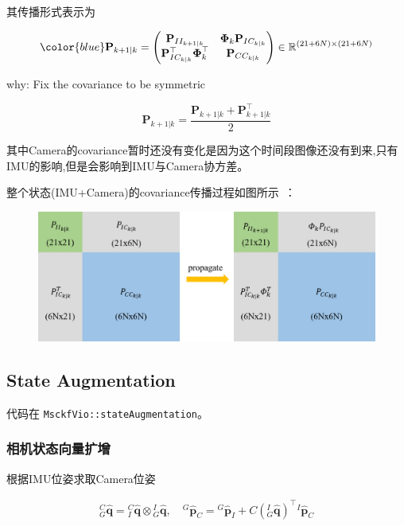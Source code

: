 \documentclass[12pt,a4paper]{article}
\begin{document}
其传播形式表示为

\begin{equation}
{\color{blue}
\mathbf{P}_{k+1|k} = 
\begin{pmatrix}
\mathbf{P}_{II_{k+1|k}} & \boldsymbol{\Phi}_k \mathbf{P}_{IC_{k|k}} \\
\mathbf{P}_{IC_{k|k}}^\top \boldsymbol{\Phi}_k^\top & \mathbf{P}_{CC_{k|k}}
\end{pmatrix}
\in \mathbb{R}^{(21+6N) \times (21+6N)}
}
\end{equation}

{\color{red}why: Fix the covariance to be symmetric}

\begin{equation}
\mathbf{P}_{k+1|k} = \frac{\mathbf{P}_{k+1|k} + \mathbf{P}_{k+1|k}^{\top}}{2}
\end{equation}

其中Camera的covariance暂时还没有变化是因为这个时间段图像还没有到来,只有IMU的影响,但是会影响到IMU与Camera协方差。

整个状态(IMU+Camera)的covariance传播过程如图所示~\cite{xinliang-zhong-msckf_notes}：

\begin{figure}[!htbp]
\centering
\includegraphics[scale=0.4]{images/imu_propagate.png}
\end{figure}

\subsection{State Augmentation}

代码在 \verb|MsckfVio::stateAugmentation|。

\subsubsection{相机状态向量扩增}

根据IMU位姿求取Camera位姿

\begin{equation}
\begin{aligned}
{}^C_G\hat{\mathbf{q}} = {}^C_I\hat{\mathbf{q}} \otimes {}^I_G\hat{\mathbf{q}}, \quad
{}^G\hat{\mathbf{p}}_C = {}^G\hat{\mathbf{p}}_I + C\left({}^I_G\hat{\mathbf{q}}\right)^\top {}^I\hat{\mathbf{p}}_C
\end{aligned}
\end{equation}
\end{document}
